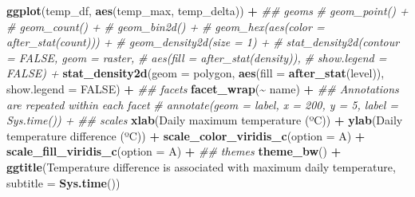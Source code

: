 \documentclass[
]{article}
\newenvironment{Shaded}{\begin{snugshade}}{\end{snugshade}}
\newcommand{\CommentTok}[1]{\textcolor[rgb]{0.56,0.35,0.01}{\textit{#1}}}
\newcommand{\DataTypeTok}[1]{\textcolor[rgb]{0.13,0.29,0.53}{#1}}
\newcommand{\KeywordTok}[1]{\textcolor[rgb]{0.13,0.29,0.53}{\textbf{#1}}}
\newcommand{\NormalTok}[1]{#1}
\newcommand{\OperatorTok}[1]{\textcolor[rgb]{0.81,0.36,0.00}{\textbf{#1}}}
\newcommand{\OtherTok}[1]{\textcolor[rgb]{0.56,0.35,0.01}{#1}}
\newcommand{\StringTok}[1]{\textcolor[rgb]{0.31,0.60,0.02}{#1}}
\begin{document}
\begin{Shaded}
\begin{Highlighting}[]
\KeywordTok{ggplot}\NormalTok{(temp\_df, }\KeywordTok{aes}\NormalTok{(temp\_max, temp\_delta)) }\OperatorTok{+}
\StringTok{    }\CommentTok{\#\# geoms}
\StringTok{    }\CommentTok{\# geom\_point() +}
\StringTok{    }\CommentTok{\# geom\_count() +}
\StringTok{    }\CommentTok{\# geom\_bin2d() +}
\StringTok{    }\CommentTok{\# geom\_hex(aes(color = after\_stat(count))) +}
\StringTok{    }\CommentTok{\# geom\_density2d(size = 1) +}
\StringTok{    }\CommentTok{\# stat\_density2d(contour = FALSE, geom = \textquotesingle{}raster\textquotesingle{},}
\StringTok{    }\CommentTok{\#                aes(fill = after\_stat(density)), }
\StringTok{    }\CommentTok{\#                show.legend = FALSE) +}
\StringTok{    }\KeywordTok{stat\_density2d}\NormalTok{(}\DataTypeTok{geom =} \StringTok{\textquotesingle{}polygon\textquotesingle{}}\NormalTok{,}
                   \KeywordTok{aes}\NormalTok{(}\DataTypeTok{fill =} \KeywordTok{after\_stat}\NormalTok{(level)),}
                   \DataTypeTok{show.legend =} \OtherTok{FALSE}\NormalTok{) }\OperatorTok{+}
\StringTok{    }\CommentTok{\#\# facets}
\StringTok{    }\KeywordTok{facet\_wrap}\NormalTok{(}\OperatorTok{\textasciitilde{}}\StringTok{ }\NormalTok{name) }\OperatorTok{+}
\StringTok{    }\CommentTok{\#\# Annotations are repeated within each facet}
\StringTok{    }\CommentTok{\# annotate(geom = \textquotesingle{}label\textquotesingle{}, x = 200, y = 5, label = Sys.time()) +}
\StringTok{    }\CommentTok{\#\# scales}
\StringTok{    }\KeywordTok{xlab}\NormalTok{(}\StringTok{\textquotesingle{}Daily maximum temperature (ºC)\textquotesingle{}}\NormalTok{) }\OperatorTok{+}
\StringTok{    }\KeywordTok{ylab}\NormalTok{(}\StringTok{\textquotesingle{}Daily temperature difference (ºC)\textquotesingle{}}\NormalTok{) }\OperatorTok{+}
\StringTok{    }\KeywordTok{scale\_color\_viridis\_c}\NormalTok{(}\DataTypeTok{option =} \StringTok{\textquotesingle{}A\textquotesingle{}}\NormalTok{) }\OperatorTok{+}
\StringTok{    }\KeywordTok{scale\_fill\_viridis\_c}\NormalTok{(}\DataTypeTok{option =} \StringTok{\textquotesingle{}A\textquotesingle{}}\NormalTok{) }\OperatorTok{+}
\StringTok{    }\CommentTok{\#\# themes}
\StringTok{    }\KeywordTok{theme\_bw}\NormalTok{() }\OperatorTok{+}
\StringTok{    }\KeywordTok{ggtitle}\NormalTok{(}\StringTok{\textquotesingle{}Temperature difference is associated with maximum daily temperature\textquotesingle{}}\NormalTok{, }
            \DataTypeTok{subtitle =} \KeywordTok{Sys.time}\NormalTok{())}
\end{Highlighting}
\end{Shaded}
\end{document}
